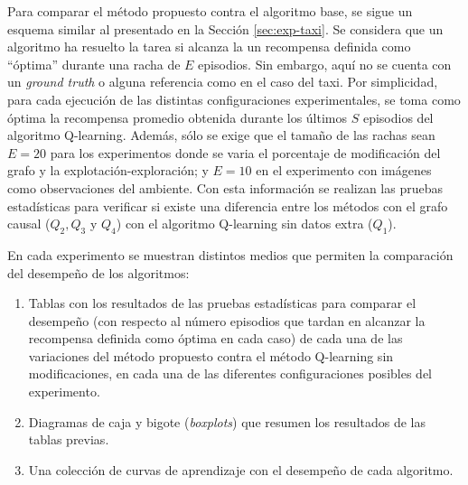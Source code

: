 Para comparar el método propuesto contra el algoritmo base, se sigue un esquema 
similar al presentado en la Sección \ref{sec:exp-taxi}. 
Se considera que un algoritmo ha resuelto la tarea si alcanza la 
un recompensa definida como ``óptima'' durante una racha de $E$ episodios.
Sin embargo, aquí no se cuenta
con un \textit{ground truth} o alguna referencia como en el caso del taxi.
Por simplicidad, para cada ejecución de las distintas configuraciones experimentales, 
se toma como óptima la recompensa promedio obtenida durante los últimos $S$ episodios del algoritmo Q-learning. Además, sólo se exige que el tamaño de las rachas sean $E=20$ para
los experimentos donde se varia el porcentaje de modificación del grafo y la 
explotación-exploración; y $E=10$ en el experimento con imágenes como observaciones del 
ambiente. Con esta información se realizan las pruebas estadísticas para
verificar si existe una diferencia entre los métodos con el grafo causal
($Q_2, Q_3$ y $Q_4$) con el algoritmo Q-learning sin datos extra ($Q_1$).

En cada experimento se muestran distintos medios que permiten 
la comparación del desempeño de los algoritmos: 

\begin{enumerate}
    \item Tablas con los resultados de las pruebas estadísticas para comparar el desempeño (con respecto al número episodios que tardan en alcanzar la recompensa definida como óptima en cada caso) de cada una de las variaciones del método 
    propuesto contra el método Q-learning sin modificaciones, en cada una de las diferentes configuraciones posibles del experimento.
\item Diagramas de caja y bigote (\textit{boxplots}) que resumen los
resultados de las tablas previas.
\item Una colección de curvas de aprendizaje con el desempeño de cada algoritmo.
\end{enumerate}

